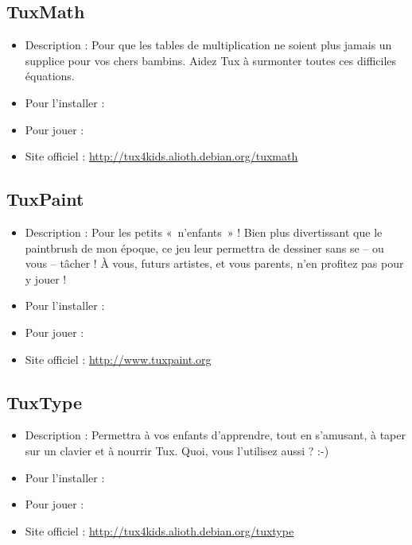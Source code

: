 \subsection{TuxMath}
\begin{itemize}
\begingroup
{}
\item Description : Pour que les tables de multiplication ne soient plus jamais un supplice pour vos chers bambins. Aidez Tux à surmonter toutes ces difficiles équations.{\par}
\item Pour l'installer : 
\item Pour jouer : 
\item Site officiel : \url{http://tux4kids.alioth.debian.org/tuxmath}{\par}
\endgroup
\end{itemize}
\subsection{TuxPaint}
\begin{itemize}
\begingroup
{}
\item Description : Pour les petits «~n'enfants~» ! Bien plus divertissant que le paintbrush de mon époque, ce jeu leur permettra de dessiner sans se -- ou vous -- tâcher ! À vous, futurs artistes, et vous parents, n'en profitez pas pour y jouer !{\par}
\item Pour l'installer : 
\item Pour jouer : 
\item Site officiel : \url{http://www.tuxpaint.org}{\par}
\endgroup
\end{itemize}
\subsection{TuxType}
\begin{itemize}
\begingroup
{}
\item Description : Permettra à vos enfants d'apprendre, tout en s'amusant, à taper sur un clavier et à nourrir Tux. Quoi, vous l'utilisez aussi ? :-){\par}
\item Pour l'installer : 
\item Pour jouer : 
\item Site officiel : \url{http://tux4kids.alioth.debian.org/tuxtype}{\par}
\endgroup
\end{itemize}

